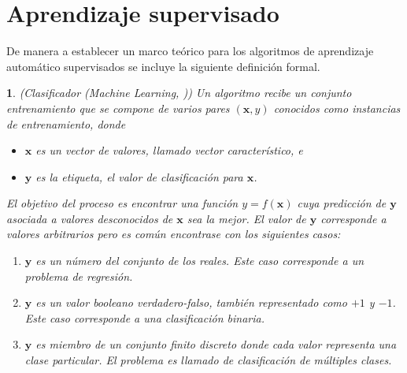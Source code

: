 \section{Aprendizaje supervisado}

\label{sec3:aprendizaje}De manera a establecer un marco teórico para los algoritmos de aprendizaje automático supervisados \cite{Rajaraman2011} se incluye la siguiente definición formal.

\label{def3:clasificacion}\newtheorem{defs}{}
\begin{defs}(Clasificador (\emph{Machine Learning}, )) Un algoritmo  recibe un conjunto entrenamiento que se compone de varios pares $(\boldsymbol{x},y)$ conocidos como instancias de entrenamiento, donde
\begin{itemize}
\item $\boldsymbol{x}$ es un \emph{vector} de valores, llamado vector característico, e
\item $\boldsymbol{y}$ es la \emph{etiqueta}, el valor de clasificación para $\boldsymbol{x}$.
\end{itemize}
El objetivo del proceso  es encontrar una función $y=f(\boldsymbol{x})$ cuya predicción de $\boldsymbol{y}$ asociada a valores desconocidos de $\boldsymbol{x}$ sea la mejor. El valor de $\boldsymbol{y}$ corresponde a valores arbitrarios pero es común encontrase con los siguientes casos:
\begin{enumerate}
\item $\boldsymbol{y}$ es un número del conjunto de los reales. Este caso corresponde a un problema de regresión.
\item $\boldsymbol{y}$ es un valor booleano verdadero-falso, también representado como $+1$ y $-1$. Este caso corresponde a una clasificación binaria. 
\item $\boldsymbol{y}$ es miembro de un conjunto finito discreto donde cada valor representa una clase particular. El problema es llamado de clasificación de múltiples clases.
\end{enumerate}
\end{defs}

